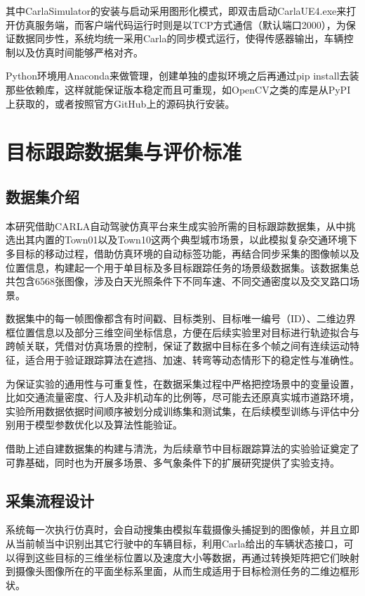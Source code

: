 其中CarlaSimulator的安装与启动采用图形化模式，即双击启动CarlaUE4.exe来打开仿真服务端，而客户端代码运行时则是以TCP方式通信（默认端口2000），为保证数据同步性，系统均统一采用Carla的同步模式运行，使得传感器输出，车辆控制以及仿真时间能够严格对齐。

Python环境用Anaconda来做管理，创建单独的虚拟环境之后再通过pip install去装那些依赖库，这样就能保证版本稳定而且可重现，如OpenCV之类的库是从PyPI上获取的，或者按照官方GitHub上的源码执行安装。

\section{目标跟踪数据集与评价标准}

\subsection{数据集介绍}

本研究借助CARLA自动驾驶仿真平台来生成实验所需的目标跟踪数据集，从中挑选出其内置的Town01以及Town10这两个典型城市场景，以此模拟复杂交通环境下多目标的移动过程，借助仿真环境的自动标签功能，再结合同步采集的图像帧以及位置信息，构建起一个用于单目标及多目标跟踪任务的场景级数据集。该数据集总共包含6568张图像，涉及白天光照条件下不同车速、不同交通密度以及交叉路口场景。

数据集中的每一帧图像都含有时间戳、目标类别、目标唯一编号（ID）、二维边界框位置信息以及部分三维空间坐标信息，方便在后续实验里对目标进行轨迹拟合与跨帧关联，凭借对仿真场景的控制，保证了数据中目标在多个帧之间有连续运动特征，适合用于验证跟踪算法在遮挡、加速、转弯等动态情形下的稳定性与准确性。

为保证实验的通用性与可重复性，在数据采集过程中严格把控场景中的变量设置，比如交通流量密度、行人及非机动车的比例等，尽可能去还原真实城市道路环境，实验所用数据依据时间顺序被划分成训练集和测试集，在后续模型训练与评估中分别用于模型参数优化以及算法性能验证。

借助上述自建数据集的构建与清洗，为后续章节中目标跟踪算法的实验验证奠定了可靠基础，同时也为开展多场景、多气象条件下的扩展研究提供了实验支持。

\subsection{采集流程设计}

系统每一次执行仿真时，会自动搜集由模拟车载摄像头捕捉到的图像帧，并且立即从当前帧当中识别出其它行驶中的车辆目标，利用Carla给出的车辆状态接口，可以得到这些目标的三维坐标位置以及速度大小等数据，再通过转换矩阵把它们映射到摄像头图像所在的平面坐标系里面，从而生成适用于目标检测任务的二维边框形状。

